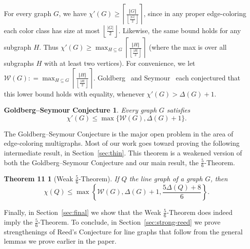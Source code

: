 \documentclass[12pt]{article}
\theoremstyle{plain}
\newtheorem*{GS}{Goldberg--Seymour Conjecture}
\newtheorem*{main2}{Theorem 11}
\theoremstyle{definition}
\theoremstyle{remark}
\newcommand{\fancy}[1]{\mathcal{#1}}
\newcommand{\W}{\fancy{W}}
\newcommand{\set}[1]{\left\{ #1 \right\}}
\newcommand{\card}[1]{\left|#1\right|}
\newcommand{\size}[1]{\left\Vert#1\right\Vert}
\newcommand{\ceil}[1]{\left\lceil#1\right\rceil}
\newcommand{\floor}[1]{\left\lfloor#1\right\rfloor}
\newcommand{\DefinedAs}{\mathrel{\mathop:}=}
\begin{document}
For every graph $G$, we have $\chi'(G)\ge
\ceil{\frac{\size{G}}{\floor{\frac{\card{G}}{2}}}}$, since in any proper
edge-coloring each color class has size at most
$\floor{\frac{\card{G}}{2}}$.  Likewise, the same bound holds for any subgraph $H$.  
Thus $\chi'(G)\ge \max_{H\subseteq G}\ceil{\frac{\size{H}}{\floor{\frac{\card{H}}{2}}}}$
(where the max is over all subgraphs $H$ with at least two vertices).
For convenience, we let $\W(G)\DefinedAs\max_{H\subseteq
G}\ceil{\frac{\size{H}}{\floor{\frac{\card{H}}{2}}}}$.
Goldberg~\cite{goldberg1973,GoldbergJGT} and
Seymour~\cite{seymour1979a,seymour1979b} each conjectured that this lower bound
holds with equality, whenever $\chi'(G)>\Delta(G)+1$.
\begin{GS}
Every graph $G$ satisfies
\[
\chi'(G)\le\max\{\W(G), \Delta(G)+1\}.
\]
\end{GS}
The Goldberg--Seymour Conjecture is the major open problem in the area of
edge-coloring multigraphs.
Most of our work goes toward proving the following
intermediate result, in Section~\ref{sec:thin}.  This theorem is a weakened
version of both the Goldberg--Seymour Conjecture and our main result, the
$\frac56$-Theorem.
\begin{main2}[Weak $\frac56$-Theorem]
If $Q$ the line graph of a graph $G$, then 
\[\chi(Q)\le \max\set{\W(G),\Delta(G)+1,\frac{5\Delta(Q)+8}{6}}.\]
\end{main2}
Finally, in Section~\ref{sec:final} we show that the Weak $\frac56$-Theorem
does indeed imply the $\frac56$-Theorem.
To conclude, in Section~\ref{sec:strong-reed} we prove strengthenings of Reed's
Conjecture for line graphs that follow from the general lemmas we prove earlier
in the paper.
\end{document}
